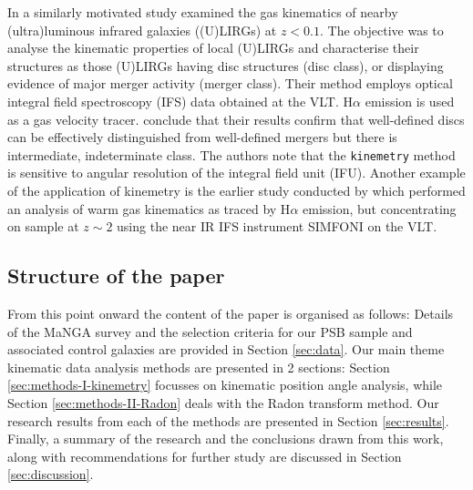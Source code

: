 In a similarly motivated study \citet{2016A&A...591A..85B} examined the gas kinematics of nearby (ultra)luminous infrared galaxies ((U)LIRGs) at $z<0.1$. The objective was to analyse the kinematic properties of local (U)LIRGs and characterise their structures as those (U)LIRGs having disc structures (disc class), or displaying evidence of major merger activity (merger class). Their method employs optical integral field spectroscopy (IFS) data obtained at the VLT. H$\alpha$ emission is used as a gas velocity tracer. \citet{2016A&A...591A..85B} conclude that their results confirm that well-defined discs can be effectively distinguished from well-defined mergers but there is intermediate, indeterminate class. The authors note that the \texttt{kinemetry} method is sensitive to angular resolution of the integral field unit (IFU). Another example of the application of kinemetry is the earlier study conducted by \citet{2008ApJ...682..231S} which performed an  analysis of warm gas kinematics as traced by H$\alpha$ emission, but concentrating on sample at $z\sim2$ using the near IR IFS instrument SIMFONI on the VLT.

\subsection{Structure of the paper}
From this point onward the content of the paper is organised as follows: Details of the MaNGA survey and the selection criteria for our PSB sample and associated control galaxies are provided in Section \ref{sec:data}. Our main theme kinematic data analysis methods are presented in 2 sections: Section \ref{sec:methods-I-kinemetry} focusses on kinematic position angle analysis, while Section \ref{sec:methods-II-Radon} deals with the Radon transform method. Our research results from each of the methods are presented in Section \ref{sec:results}. Finally, a summary of the research and the conclusions drawn from this work, along with recommendations for further study are discussed in Section \ref{sec:discussion}.
